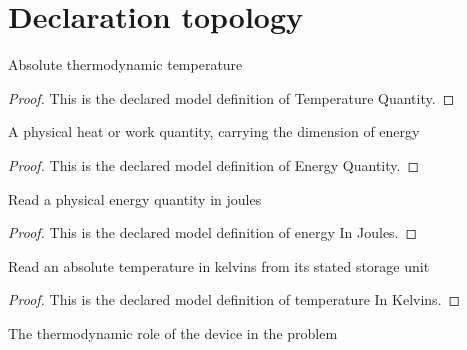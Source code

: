 \section{Declaration topology}
\begin{definition}
  \label{def:physics:phyx-mini-0474:phyxminiproblems-problemphyxmini0474-temperaturequantity}
  Absolute thermodynamic temperature
\end{definition}
\begin{proof}
  This is the declared model definition of Temperature Quantity.
\end{proof}
\begin{definition}
  \label{def:physics:phyx-mini-0474:phyxminiproblems-problemphyxmini0474-energyquantity}
  A physical heat or work quantity, carrying the dimension of energy
\end{definition}
\begin{proof}
  This is the declared model definition of Energy Quantity.
\end{proof}
\begin{definition}
  \label{def:physics:phyx-mini-0474:phyxminiproblems-problemphyxmini0474-energyinjoules}
  Read a physical energy quantity in joules
\end{definition}
\begin{proof}
  This is the declared model definition of energy In Joules.
\end{proof}
\begin{definition}
  \label{def:physics:phyx-mini-0474:phyxminiproblems-problemphyxmini0474-temperatureinkelvins}
  Read an absolute temperature in kelvins from its stated storage unit
\end{definition}
\begin{proof}
  This is the declared model definition of temperature In Kelvins.
\end{proof}
\begin{definition}
  \label{def:physics:phyx-mini-0474:phyxminiproblems-problemphyxmini0474-thermodynamicdevicerole}
  The thermodynamic role of the device in the problem
\end{definition}
